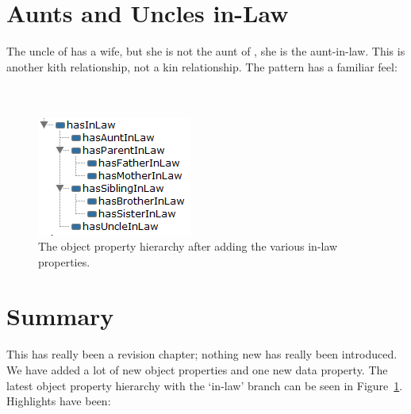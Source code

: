 \section{Aunts and Uncles in-Law}
\label{sec:uncle-in-law}

The uncle of \rds has a wife, but she is not the aunt of \rds, she is the aunt-in-law. This is another kith relationship, not a kin relationship. The pattern has a familiar feel:
\\\\
\\

\begin{figure}
\begin{center}
\includegraphics[width=\figwidth]{figures/new/prophierarchyinlaw}
\caption{The object property hierarchy after adding the various in-law properties.}
\label{fig:prop_marriage}
\end{center}
\end{figure}

\section{Summary}
This has really been a revision chapter; nothing new has really been introduced. We have added a lot of new object properties and one new data property. The latest object property hierarchy with the `in-law' branch can be seen in Figure~\ref{fig:prop_marriage}. Highlights have been:

